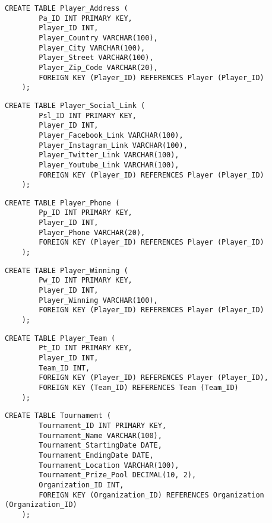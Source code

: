     \begin{lstlisting}[caption={Create Player Address table}, label={lst:create_player_address}]
    CREATE TABLE Player_Address (
        Pa_ID INT PRIMARY KEY,
        Player_ID INT,
        Player_Country VARCHAR(100),
        Player_City VARCHAR(100),
        Player_Street VARCHAR(100),
        Player_Zip_Code VARCHAR(20),
        FOREIGN KEY (Player_ID) REFERENCES Player (Player_ID)
    );
    \end{lstlisting}

    \begin{lstlisting}[caption={Create Player Social Link table}, label={lst:create_player_social_link}]
    CREATE TABLE Player_Social_Link (
        Psl_ID INT PRIMARY KEY,
        Player_ID INT,
        Player_Facebook_Link VARCHAR(100),
        Player_Instagram_Link VARCHAR(100),
        Player_Twitter_Link VARCHAR(100),
        Player_Youtube_Link VARCHAR(100),
        FOREIGN KEY (Player_ID) REFERENCES Player (Player_ID)
    );
    \end{lstlisting}
    \clearpage
    \begin{lstlisting}[caption={Create Player Phone table}, label={lst:create_player_phone}]
    CREATE TABLE Player_Phone (
        Pp_ID INT PRIMARY KEY,
        Player_ID INT,
        Player_Phone VARCHAR(20),
        FOREIGN KEY (Player_ID) REFERENCES Player (Player_ID)
    );
    \end{lstlisting}
    \begin{lstlisting}[caption={Create Player Winning table}, label={lst:create_player_winning}]
    CREATE TABLE Player_Winning (
        Pw_ID INT PRIMARY KEY,
        Player_ID INT,
        Player_Winning VARCHAR(100),
        FOREIGN KEY (Player_ID) REFERENCES Player (Player_ID)
    );
    \end{lstlisting}
    
    \begin{lstlisting}[caption={Create Player Team table}, label={lst:create_player_team}]
    CREATE TABLE Player_Team (
        Pt_ID INT PRIMARY KEY,
        Player_ID INT,
        Team_ID INT,
        FOREIGN KEY (Player_ID) REFERENCES Player (Player_ID),
        FOREIGN KEY (Team_ID) REFERENCES Team (Team_ID)
    );
    \end{lstlisting}
    
    \begin{lstlisting}[caption={Create Tournament table}, label={lst:create_tournament}]
    CREATE TABLE Tournament (
        Tournament_ID INT PRIMARY KEY,
        Tournament_Name VARCHAR(100),
        Tournament_StartingDate DATE,
        Tournament_EndingDate DATE,
        Tournament_Location VARCHAR(100),
        Tournament_Prize_Pool DECIMAL(10, 2),
        Organization_ID INT,
        FOREIGN KEY (Organization_ID) REFERENCES Organization (Organization_ID)
    );
    \end{lstlisting}
  
